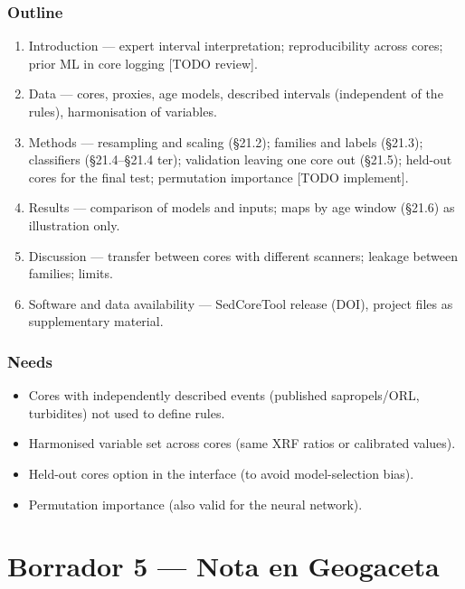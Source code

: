 \documentclass[
  10pt,
]{article}
\providecommand{\tightlist}{%
  \setlength{\itemsep}{0pt}\setlength{\parskip}{0pt}}
\begin{document}
\hypertarget{outline-1}{%
\subsubsection{Outline}\label{outline-1}}

\begin{enumerate}
\def\labelenumi{\arabic{enumi}.}
\tightlist
\item
  Introduction --- expert interval interpretation; reproducibility
  across cores; prior ML in core logging {[}TODO review{]}.
\item
  Data --- cores, proxies, age models, described intervals (independent
  of the rules), harmonisation of variables.
\item
  Methods --- resampling and scaling (§21.2); families and labels
  (§21.3); classifiers (§21.4--§21.4 ter); validation leaving one core
  out (§21.5); held-out cores for the final test; permutation importance
  {[}TODO implement{]}.
\item
  Results --- comparison of models and inputs; maps by age window
  (§21.6) as illustration only.
\item
  Discussion --- transfer between cores with different scanners; leakage
  between families; limits.
\item
  Software and data availability --- SedCoreTool release (DOI), project
  files as supplementary material.
\end{enumerate}

\hypertarget{needs-2}{%
\subsubsection{Needs}\label{needs-2}}

\begin{itemize}
\tightlist
\item[$\square$]
  Cores with independently described events (published sapropels/ORL,
  turbidites) not used to define rules.
\item[$\square$]
  Harmonised variable set across cores (same XRF ratios or calibrated
  values).
\item[$\square$]
  Held-out cores option in the interface (to avoid model-selection
  bias).
\item[$\square$]
  Permutation importance (also valid for the neural network).
\end{itemize}

\newpage

\hypertarget{borrador-5-nota-en-geogaceta}{%
\section{Borrador 5 --- Nota en
Geogaceta}\label{borrador-5-nota-en-geogaceta}}
\end{document}
